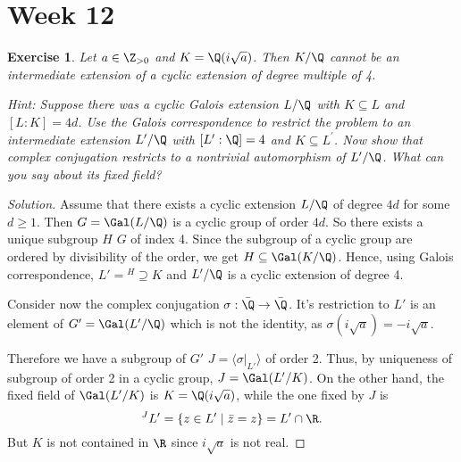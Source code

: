 \documentclass[a4paper,10pt,reqno]{amsart}
\newtheorem{ex}{Exercise}[section]
\newenvironment{sol}
  {\renewcommand\qedsymbol{$\blacksquare$}\begin{proof}[Solution]}
  {\end{proof}}
\begin{document}
\newpage

\section{Week 12}

\begin{ex}
\label{12.1}
    Let $a\in\Z_{>0}$ and $K=\Q(i\sqrt{a})$.
    Then $K/\Q$ cannot be an intermediate extension
    of a cyclic extension of degree multiple of 4. 

    \noindent \textit{Hint:} Suppose there was a cyclic Galois extension $L/\Q$ with $K \subseteq L$ and $[L:K] = 4d$. Use the Galois correspondence to restrict the problem to an intermediate extension $L^{\prime}/\Q$ with $[L^{\prime}:\Q] = 4$ and $K \subseteq L^{\prime}$. Now show that complex conjugation restricts to a nontrivial automorphism of $L^{\prime}/\Q$. What can you say about its fixed field?
\end{ex}

\begin{sol}
    Assume that there exists a cyclic extension
    $L/\Q$ of degree $4d$ for some $d\geq 1$.
    Then $G=\Gal(L/\Q)$ is a cyclic group of order
    $4d$. So there exists a unique subgroup $H$
    $G$ of index 4.
    Since the subgroup of a cyclic group are ordered by divisibility of the order, we get
    $H\subseteq \Gal(K/\Q)$.
    Hence, using Galois correspondence,
    $L'={}^H\supseteq K$ and $L'/\Q$ is a cyclic 
    extension of degree 4.

    Consider now the complex conjugation 
    $\sigma: \Bar{\Q}\to \Bar{\Q}$.
    It's restriction to $L'$ is an element of
    $G'=\Gal(L'/\Q)$ which is not the identity,
    as $\sigma(i\sqrt{a})=-i\sqrt{a}$.

Therefore we have a subgroup of $G'$
$J=\langle \sigma|_{L'}\rangle$ of order 2.
Thus, by uniqueness of subgroup of order 2 in
a cyclic group, $J=\Gal(L'/K)$.
On the other hand, the fixed field of 
$\Gal(L'/K)$ is $K=\Q(i\sqrt{a})$, while the one fixed by $J$ is
$${}^J L'=\{z\in L'\mid \Bar{z}=z\}=L'\cap\R.$$
But $K$ is not contained in $\R$ since 
$i\sqrt{a}$ is not real.
\end{sol}
\end{document}
